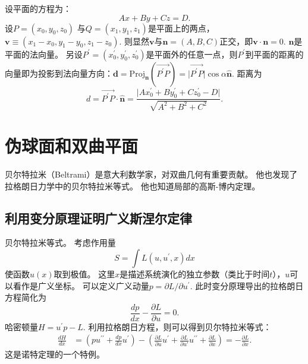 \documentclass{article}
\begin{document}
\begin{tcolorbox}[colback=white, arc=3mm, auto outer arc]
\begin{minipage}[c,t]{1.0\textwidth}
\kaishu
设平面的方程为：
\begin{equation*}
    Ax+By+Cz=D.
\end{equation*}
设$P=(x_{0}, y_{0}, z_{0})$ 与$Q=(x_{1}, y_{1}, z_{1})$是平面上的两点，$\mathbf{v}\equiv(x_{1}-x_{0}, y_{1}-y_{0}, z_{1}-z_{0})$.
则显然$\mathbf{v}$与$\mathbf{n}=(A, B, C)$正交，即$\mathbf{v}\cdot\mathbf{n}=0$.
$\mathbf{n}$是平面的法向量。
另设$P^{\prime}=(x_{0}^{\prime}, y_{0}^{\prime}, z_{0}^{\prime})$是平面外的任意一点，则$P^{\prime}$到平面的距离的向量即为投影到法向量方向：$    \mathbf{d}=\text{Proj}_{\mathbf{n}}\left(\overrightarrow{P^{\prime}P}\right)=\vert\overrightarrow{P^{\prime}P}\vert\cos\alpha\hat{\mathbf{n}}$.
距离为
\begin{equation*}
d=\overrightarrow{P^{\prime}P}\cdot\hat{\mathbf{n}}
=\frac{\vert Ax_{0}^{\prime}+By_{0}^{\prime}+Cz_{0}^{\prime}-D\vert}{\sqrt{A^{2}+B^{2}+C^{2}}}.
\end{equation*}
\end{minipage}
\end{tcolorbox}

\section{伪球面和双曲平面}

贝尔特拉米（Beltrami）是意大利数学家，对双曲几何有重要贡献。
他也发现了拉格朗日力学中的贝尔特拉米等式。
他也知道局部的高斯-博内定理。

\subsection{利用变分原理证明广义斯涅尔定律}

\begin{tcolorbox}[colback=white, arc=3mm, auto outer arc]
\begin{minipage}[c,t]{1.0\textwidth}
\kaishu
贝尔特拉米等式。
考虑作用量
\begin{equation*}
    S=\int{L}(u, u^{\prime}, x)dx
\end{equation*}
使函数$u(x)$取到极值。
这里$x$是描述系统演化的独立参数（类比于时间$t$），$u$可以看作是广义坐标。
可以定义广义动量$p=\partial{L}/\partial{u^{\prime}}$.
此时变分原理导出的拉格朗日方程简化为
\begin{equation*}
    \frac{dp}{dx}-\frac{\partial{L}}{\partial{u}}=0.
\end{equation*}
哈密顿量$H=u^{\prime}p-L$.
利用拉格朗日方程，则可以得到贝尔特拉米等式：
\begin{equation*}
\begin{aligned}
\frac{dH}{dx}
&=\left(pu^{\prime\prime}+\frac{dp}{dx}u^{\prime}\right)-\left(\frac{\partial{L}}{\partial{u}}u^{\prime}+\frac{\partial{L}}{\partial{u\prime}}u^{\prime\prime}+\frac{\partial{L}}{\partial{x}}\right)=-\frac{\partial{L}}{\partial{x}}.
\end{aligned}
\end{equation*}
这是诺特定理的一个特例。
\end{minipage}
\end{tcolorbox}
\end{document}
